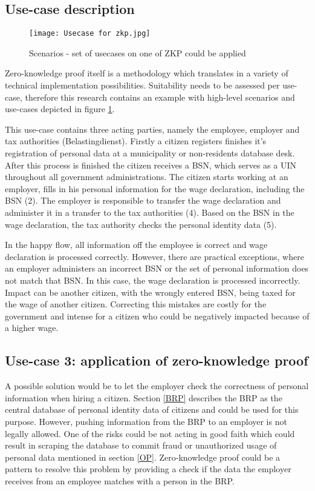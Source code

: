 \subsection{Use-case description}
\graphicspath{ {./images/} }
\begin{figure}
\centering
\label{fig:ZKP_usecase}
\texttt{[image: Usecase for zkp.jpg]}\\
\caption{Scenarios - set of usecases on one of ZKP could be applied}
\end{figure}
Zero-knowledge proof itself is a methodology which translates in a variety of technical implementation possibilities. Suitability needs to be assessed per use-case, therefore this research contains an example with high-level scenarios and use-cases depicted in figure \ref{fig:ZKP_usecase}.

This use-case contains three acting parties, namely the employee, employer and tax authorities (Belastingdienst).
Firstly a citizen registers finishes it's registration of personal data at a municipality or non-residents database desk. After this process is finished the citizen receives a BSN, which serves as a UIN throughout all government administrations. The citizen starts working at an employer, fills in his personal information for the wage declaration, including the BSN (2). The employer is responsible to transfer the wage declaration and administer it in a transfer to the tax authorities (4). Based on the BSN in the wage declaration, the tax authority checks the personal identity data (5). \par
In the happy flow, all information off the employee is correct and wage declaration is processed correctly. However, there are practical exceptions, where an employer administers an incorrect BSN or the set of personal information does not match that BSN. In this case, the wage declaration is processed incorrectly. Impact can be another citizen, with the wrongly entered BSN, being taxed for the wage of another citizen. Correcting this mistakes are costly for the government and intense for a citizen who could be negatively impacted because of a higher wage.

\subsection{Use-case 3: application of zero-knowledge proof}
A possible solution would be to let the employer check the correctness of personal information when hiring a citizen. Section \ref{BRP} describes the BRP as the central database of personal identity data of citizens and could be used for this purpose. However, pushing information from the BRP to an employer is not legally allowed. One of the risks could be not acting in good faith which could result in scraping the database to commit fraud or unauthorized usage of personal data mentioned in section \ref{OP}. Zero-knowledge proof could be a pattern to resolve this problem by providing a check if the data the employer receives from an employee matches with a person in the BRP. 

